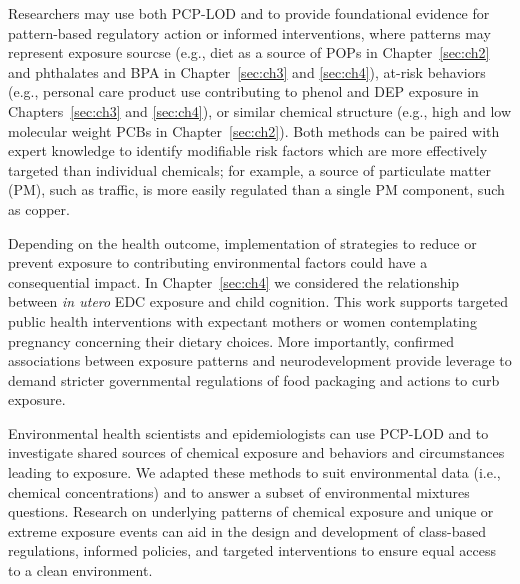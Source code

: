 Researchers may use both PCP-LOD and \bnmf to provide foundational evidence for pattern-based regulatory action or informed interventions, where patterns may represent exposure sourcse (e.g., diet as a source of POPs in Chapter~\ref{sec:ch2} and phthalates and BPA in Chapter~\ref{sec:ch3} and  \ref{sec:ch4}), at-risk behaviors (e.g., personal care product use contributing to phenol and DEP exposure in Chapters~\ref{sec:ch3} and \ref{sec:ch4}), or similar chemical structure (e.g., high and low molecular weight PCBs in Chapter~\ref{sec:ch2}). Both methods can be paired with expert knowledge to identify modifiable risk factors which are more effectively targeted than individual chemicals; for example, a source of particulate matter (PM), such as traffic, is more easily regulated than a single PM component, such as copper.

Depending on the health outcome, implementation of strategies to reduce or prevent exposure to contributing environmental factors could have a consequential impact. In Chapter~\ref{sec:ch4} we considered the relationship between \textit{in utero} EDC exposure and child cognition. This work supports targeted public health interventions with expectant mothers or women contemplating pregnancy concerning their dietary choices. More importantly, confirmed associations between exposure patterns and neurodevelopment provide leverage to demand stricter governmental regulations of food packaging and actions to curb exposure.

Environmental health scientists and epidemiologists can use PCP-LOD and \bnmf to investigate shared sources of chemical exposure and behaviors and circumstances leading to exposure. We adapted these methods to suit environmental data (i.e., chemical concentrations) and to answer a subset of environmental mixtures questions. Research on underlying patterns of chemical exposure and unique or extreme exposure events can aid in the design and development of class-based regulations, informed policies, and targeted interventions to ensure equal access to a clean environment.